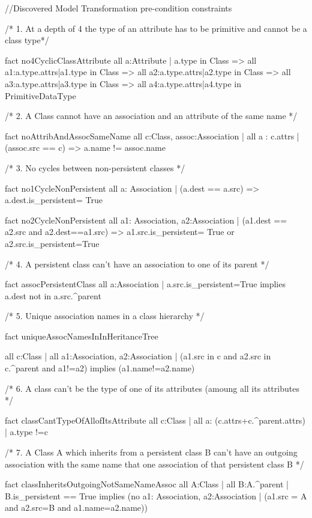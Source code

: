 
//Discovered Model Transformation pre-condition constraints

/* 1. At a depth of 4 the type of an attribute has to be primitive  and cannot be a class type*/

fact no4CyclicClassAttribute{
	all a:Attribute | a.type in Class => all a1:a.type.attrs|a1.type in
	Class => all a2:a.type.attrs|a2.type in Class => all
	a3:a.type.attrs|a3.type in Class => all a4:a.type.attrs|a4.type
	in PrimitiveDataType }

/* 2.  A Class cannot have an association and an attribute of the same name */

fact noAttribAndAssocSameName{
	all c:Class, assoc:Association | all a : c.attrs | (assoc.src == c) => a.name != assoc.name
}


/* 3. No cycles between non-persistent classes */

fact no1CycleNonPersistent
{
      all a: Association | (a.dest == a.src) => a.dest.is_persistent= True 
}



fact no2CycleNonPersistent
{
      all a1: Association, a2:Association | (a1.dest == a2.src and a2.dest==a1.src) => a1.src.is_persistent= True or a2.src.is_persistent=True  
}



/* 4.  A persistent class can't have an association to one of its parent */

fact assocPersistentClass
{
	all a:Association | a.src.is_persistent=True implies a.dest not in a.src.^parent
}



/* 5. Unique association names in a class hierarchy */

fact uniqueAssocNamesInInHeritanceTree
{
     all c:Class |
    all a1:Association, a2:Association |
    (a1.src in c and a2.src in c.^parent and a1!=a2) implies (a1.name!=a2.name)
    
   
 }


/* 6. A class can't be the type of one of its attributes (amoung all its
attributes */


fact classCantTypeOfAllofItsAttribute
{
 all c:Class | all a: (c.attrs+c.^parent.attrs) | a.type !=c
} 

/* 7. A Class A which inherits from a persistent class B can't have an outgoing association with the same name
that one association of that persistent class B */

fact classInheritsOutgoingNotSameNameAssoc
{
	all A:Class | all B:A.^parent | B.is_persistent == True implies (no a1: Association, a2:Association | 
(a1.src = A and a2.src=B and a1.name=a2.name))
}


